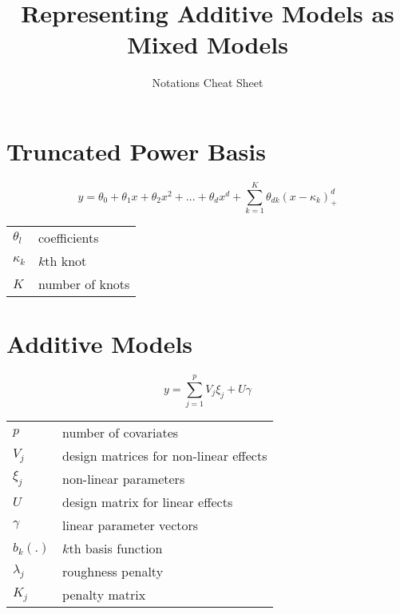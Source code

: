 \documentclass{article}
\title{Representing Additive Models as Mixed Models}
\author{Notations Cheat Sheet}
\date{}
\begin{document}
\def\arraystretch{1.3}
\maketitle
\vspace{2em}
\begin{multicols}{2}
%


\section*{Truncated Power Basis}

$$y = \theta_0 + \theta_1x + \theta_2x^2 + ... + \theta_dx^d + \sum_{k=1}^K \theta_{dk}(x-\kappa_k)_+^d $$

\begin{tabular}{l l}
$\theta_l$ & coefficients \\
$\kappa_k$ & $k$th knot \\
$K$ & number of knots \\
\end{tabular}

\section*{Additive Models}

$$y = \sum_{j=1}^p V_j\xi_j + U\gamma$$

\begin{tabular}{l l}
$p$ & number of covariates \\
$V_j$ & design matrices for non-linear effects \\
$\xi_j$ & non-linear parameters \\
$U$ & design matrix for linear effects \\
$\gamma$ & linear parameter vectors \\
$b_k(.)$ & $k$th basis function \\
$\lambda_j$ & roughness penalty \\
$K_j$ & penalty matrix \\
\end{tabular}


\end{multicols}
\end{document}
